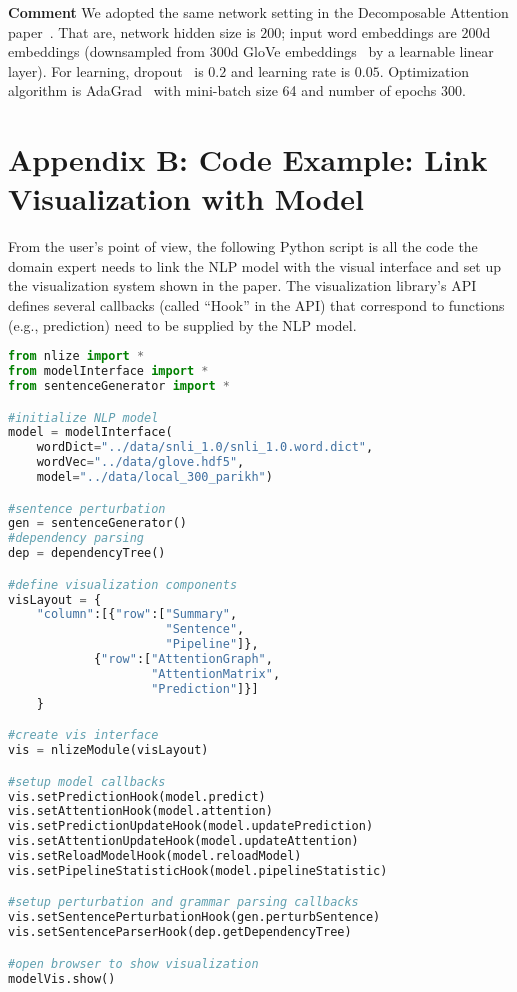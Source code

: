 \documentclass[review,journal]{vgtc}         %
\newcommand{\taoli}[1]{\textcolor{orange}{[#1]}}
\begin{document}

\textbf{Comment} We adopted the same network setting in the Decomposable Attention paper~\cite{parikh2016emnlp}. That are, network hidden size is $200$; input word embeddings are $200$d embeddings (downsampled from $300$d GloVe embeddings~\cite{PenningtonSocherManning2014} by a learnable linear layer). For learning, dropout~\cite{SrivastavaHinton2014} is $0.2$ and learning rate is $0.05$. Optimization algorithm is AdaGrad~\cite{duchi2011adaptive} with mini-batch size 64 and number of epochs 300.

\section{Appendix B: Code Example: Link Visualization with Model}
From the user's point of view, the following Python script is all the code the domain expert needs to link the NLP model with the visual interface and set up the visualization system shown in the paper. The visualization library's API defines several callbacks (called ``Hook'' in the API) that correspond to functions (e.g., prediction) need to be supplied by the NLP model.

\begin{lstlisting}[language=Python, caption=Code for setting up the visualization system shown in the paper.]
from nlize import *
from modelInterface import *
from sentenceGenerator import *

#initialize NLP model
model = modelInterface(
    wordDict="../data/snli_1.0/snli_1.0.word.dict",
    wordVec="../data/glove.hdf5", 
    model="../data/local_300_parikh")

#sentence perturbation
gen = sentenceGenerator()
#dependency parsing
dep = dependencyTree()

#define visualization components
visLayout = {
    "column":[{"row":["Summary", 
                      "Sentence", 
                      "Pipeline"]},
            {"row":["AttentionGraph", 
                    "AttentionMatrix", 
                    "Prediction"]}]
    }

#create vis interface
vis = nlizeModule(visLayout)

#setup model callbacks
vis.setPredictionHook(model.predict)
vis.setAttentionHook(model.attention)
vis.setPredictionUpdateHook(model.updatePrediction)
vis.setAttentionUpdateHook(model.updateAttention)
vis.setReloadModelHook(model.reloadModel)
vis.setPipelineStatisticHook(model.pipelineStatistic)

#setup perturbation and grammar parsing callbacks
vis.setSentencePerturbationHook(gen.perturbSentence)
vis.setSentenceParserHook(dep.getDependencyTree)

#open browser to show visualization
modelVis.show()

\end{lstlisting}

%
%
%


\end{document}
